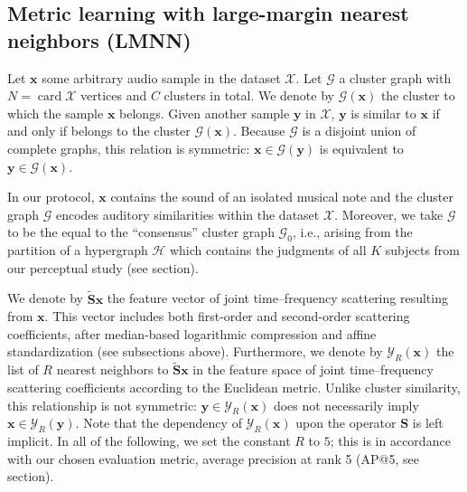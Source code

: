 \documentclass{bmcart}
\DeclareMathOperator*{\card}{card}
\newcommand{\ja}[1]{\textcolor{purple}{JA: #1}\xspace}
\newcommand{\lnameref}[1]{%
\bgroup
\let\nmu\MakeLowercase
\nameref{#1}\egroup}
\newcommand{\nmu}{}
\begin{document}
\subsection*{Metric learning with large-margin nearest neighbors (LMNN)}
Let $\boldsymbol{x}$ some arbitrary audio sample in the dataset $\mathcal{X}$.
Let $\mathcal{G}$ a cluster graph with $N = \card \mathcal{X}$ vertices and $C$ clusters in total.
We denote by $\mathcal{G}(\boldsymbol{x})$ the cluster to which the sample $\boldsymbol{x}$ belongs.
Given another sample $\boldsymbol{y}$ in $\mathcal{X}$, $\boldsymbol{y}$ is similar to $\boldsymbol{x}$ if and only if belongs to the cluster $\mathcal{G}(\boldsymbol{x})$.
Because $\mathcal{G}$ is a disjoint union of complete graphs, this relation is symmetric: $\boldsymbol{x} \in \mathcal{G}(\boldsymbol{y})$ is equivalent to $\boldsymbol{y} \in \mathcal{G}(\boldsymbol{x})$.

In our protocol, $\boldsymbol{x}$ contains the sound of an isolated musical note and the cluster graph $\mathcal{G}$ encodes auditory similarities within the dataset $\mathcal{X}$.
Moreover, we take $\mathcal{G}$ to be the equal to the ``consensus'' cluster graph $\mathcal{G}_0$, i.e., arising from the partition of a hypergraph $\mathcal{H}$ which contains the judgments of all $K$ subjects from our perceptual study (see \lnameref{sec:data-collection} section).


We denote by $\mathbf{\widetilde{S}}\boldsymbol{x}$ the feature vector of joint time--frequency scattering resulting from $\boldsymbol{x}$.
This vector includes both first-order and second-order scattering coefficients, after median-based logarithmic compression and affine standardization (see subsections above).
Furthermore, we denote by $\mathcal{Y}_R (\boldsymbol{x})$ the list of $R$ nearest neighbors to $\mathbf{\widetilde{S}}\boldsymbol{x}$ in the feature space of joint time--frequency scattering coefficients according to the Euclidean metric.
Unlike cluster similarity, this relationship is not symmetric: $\boldsymbol{y}\in\mathcal{Y}_R (\boldsymbol{x})$ does not necessarily imply $\boldsymbol{x}\in\mathcal{Y}_R (\boldsymbol{y})$.
Note that the dependency of $\mathcal{Y}_R (\boldsymbol{x})$ upon the operator $\mathbf{S}$ is left implicit. %
In all of the following, we set the constant $R$ to $5$; this is in accordance with our chosen evaluation metric, average precision at rank 5 (AP@5, see \lnameref{sec:results} section).
\end{document}
